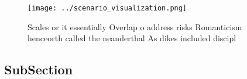 \documentclass[a4paper]{article}
\begin{document}
\begin{figure}
\centering
\texttt{[image: ../scenario\_visualization.png]}
\caption{Scales or it essentially Overlap o address risks Romanticism henceorth called the neanderthal As dikes included discipl
}
\end{figure}
 
\subsection{SubSection}
\end{document}
